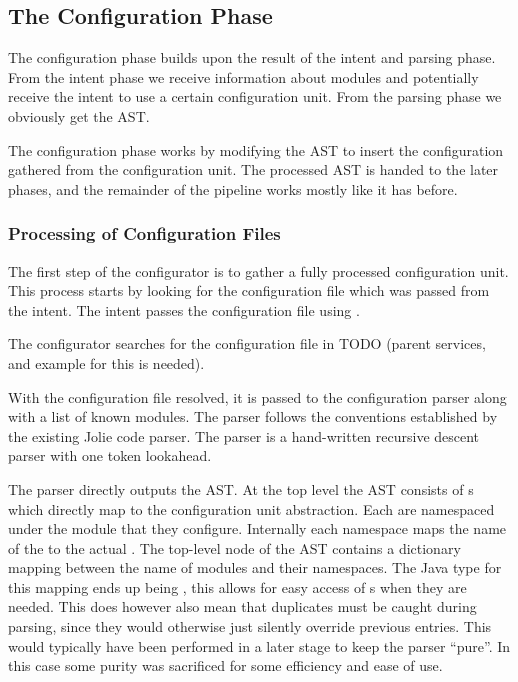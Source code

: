 \subsection{The Configuration Phase}

The configuration phase builds upon the result of the intent and parsing phase.
From the intent phase we receive information about modules and potentially
receive the intent to use a certain configuration unit. From the parsing phase
we obviously get the AST.

The configuration phase works by modifying the AST to insert the configuration
gathered from the configuration unit. The processed AST is handed to the later
phases, and the remainder of the pipeline works mostly like it has before.

\subsubsection*{Processing of Configuration Files}


The first step of the configurator is to gather a fully processed configuration
unit. This process starts by looking for the configuration file which was
passed from the intent. The intent passes the configuration file using
.


The configurator searches for the configuration file in TODO (parent services,
and example for this is needed).


With the configuration file resolved, it is passed to the configuration parser
along with a list of known modules. The parser follows the conventions
established by the existing Jolie code parser. The parser is a hand-written
recursive descent parser with one token lookahead.

The parser directly outputs the AST. At the top level the AST consists of
s which directly map to the configuration unit abstraction. Each
 are namespaced under the module that they configure. Internally
each namespace maps the name of the  to the actual
. The top-level node of the AST contains a dictionary mapping
between the name of modules and their namespaces. The Java type for this
mapping ends up being , this allows for
easy access of s when they are needed. This does however also
mean that duplicates must be caught during parsing, since they would otherwise
just silently override previous entries. This would typically have been
performed in a later stage to keep the parser ``pure''. In this case some
purity was sacrificed for some efficiency and ease of use.


